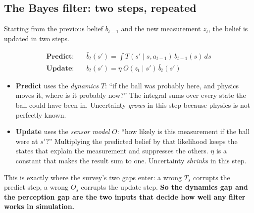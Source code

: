 \documentclass[11pt,a4paper]{article}
\begin{document}
\subsection{The Bayes filter: two steps, repeated}
Starting from the previous belief $b_{t-1}$ and the new measurement $z_t$, the belief is updated
in two steps.
\begin{eqbox}
\begin{align*}
\textbf{Predict:}\quad & \bar b_t(s')=\int T(s'\mid s,a_{t-1})\,b_{t-1}(s)\,ds\\
\textbf{Update:}\quad & b_t(s')=\eta\ O(z_t\mid s')\,\bar b_t(s')
\end{align*}
\end{eqbox}
\begin{itemize}
\item \textbf{Predict} uses the \emph{dynamics} $T$: ``if the ball was probably here, and physics
moves it, where is it probably now?'' The integral sums over every state the ball could have been
in. Uncertainty \emph{grows} in this step because physics is not perfectly known.
\item \textbf{Update} uses the \emph{sensor model} $O$: ``how likely is this measurement if the
ball were at $s'$?'' Multiplying the predicted belief by that likelihood keeps the states that
explain the measurement and suppresses the others. $\eta$ is a constant that makes the result sum
to one. Uncertainty \emph{shrinks} in this step.
\end{itemize}
This is exactly where the survey's two gaps enter: a wrong $T_s$ corrupts the predict step, a wrong
$O_s$ corrupts the update step. \textbf{So the dynamics gap and the perception gap are the two
inputs that decide how well any filter works in simulation.}
\end{document}
